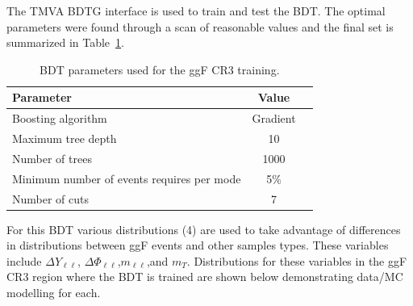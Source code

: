 The TMVA BDTG interface is used to train and test the BDT. The optimal parameters were found through a scan of reasonable values and the final set is summarized in Table~\ref{tab:ggFCR3BDTparameters}.
\begin{table}[h!]
\centering
\begin{tabular}{|l|c|c|}
\hline
Parameter                                    & Value     \\
\hline
Boosting algorithm                           & Gradient \\
Maximum tree depth                           &  10      \\
Number of trees                              &  1000    \\
Minimum number of events requires per mode   &  5\%     \\ 
Number of cuts                               &  7       \\
\hline
\end{tabular}
\caption{BDT parameters used for the ggF CR3 training.}
\label{tab:ggFCR3BDTparameters}
\end{table}
For this BDT various distributions (4) are used to take advantage of differences in distributions between ggF events and other samples types. These variables include $\Delta Y_{\ell\ell}$, $\Delta \Phi_{\ell\ell}$,$m_{\ell\ell}$,and $m_T$. Distributions for these variables in the ggF CR3 region where the BDT is trained are shown below demonstrating data/MC modelling for each.
